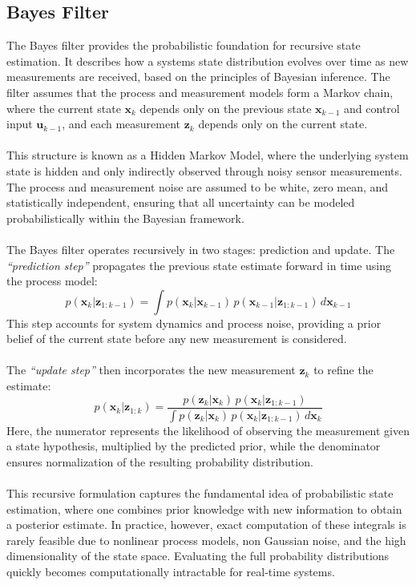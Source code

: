 \subsection{Bayes Filter}
The Bayes filter provides the probabilistic foundation for recursive state estimation. It describes how a systems state distribution evolves over time as new measurements are received, based on the principles of Bayesian inference. The filter assumes that the process and measurement models form a Markov chain, where the current state $\mathbf{x}_k$ depends only on the previous state $\mathbf{x}_{k-1}$ and control input $\mathbf{u}_{k-1}$, and each measurement $\mathbf{z}_k$ depends only on the current state.  
\\ \\
This structure is known as a Hidden Markov Model, where the underlying system state is hidden and only indirectly observed through noisy sensor measurements. The process and measurement noise are assumed to be white, zero mean, and statistically independent, ensuring that all uncertainty can be modeled probabilistically within the Bayesian framework.  
\\ \\
The Bayes filter operates recursively in two stages: prediction and update. The \textit{``prediction step''} propagates the previous state estimate forward in time using the process model:
$$
    p(\mathbf{x}_k | \mathbf{z}_{1:k-1}) = \int p(\mathbf{x}_k | \mathbf{x}_{k-1})\,p(\mathbf{x}_{k-1} | \mathbf{z}_{1:k-1})\,d\mathbf{x}_{k-1}
$$
This step accounts for system dynamics and process noise, providing a prior belief of the current state before any new measurement is considered.  
\\ \\
The \textit{``update step''} then incorporates the new measurement $\mathbf{z}_k$ to refine the estimate:
$$
    p(\mathbf{x}_k | \mathbf{z}_{1:k}) =
    \frac{p(\mathbf{z}_k | \mathbf{x}_k)\,p(\mathbf{x}_k | \mathbf{z}_{1:k-1})}
    {\int p(\mathbf{z}_k | \mathbf{x}_k)\,p(\mathbf{x}_k | \mathbf{z}_{1:k-1})\,d\mathbf{x}_k}
$$
Here, the numerator represents the likelihood of observing the measurement given a state hypothesis, multiplied by the predicted prior, while the denominator ensures normalization of the resulting probability distribution.  
\\ \\
This recursive formulation captures the fundamental idea of probabilistic state estimation, where one combines prior knowledge with new information to obtain a posterior estimate. In practice, however, exact computation of these integrals is rarely feasible due to nonlinear process models, non Gaussian noise, and the high dimensionality of the state space. Evaluating the full probability distributions quickly becomes computationally intractable for real-time systems.  
